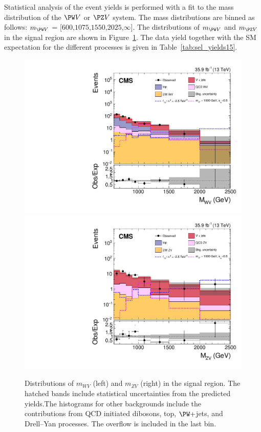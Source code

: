 Statistical analysis of the event yields is performed with a fit to the mass distribution of the $\PW V$ or $\PZ V$ system. The mass distributions are binned as follows: $m_{\PW V}$ = [$600$,$1075$,$1550$,$2025$,$\infty$]. The distributions of $m_{\PW V}$ and $m_{\PZ V}$ in the signal region are shown in Figure~\ref{fig:signal2}. The data yield together with the SM expectation for the different processes is given in Table~\ref{tab:sel_yields15}.


\begin{figure}[htb]
\centering
\includegraphics[width=\cmsFigWidth]{Plots/plots/wv_signal.pdf}
\includegraphics[width=\cmsFigWidth]{Plots/plots/zv_signal.pdf}
\caption{Distributions of $m_{WV}$ (left) and $m_{ZV}$ (right) in
the signal region. The hatched bands include statistical uncertainties from the predicted yields.The histograms for other backgrounds include the contributions
from QCD initiated dibosons, top, $\PW+$jets, and Drell--Yan processes. The overflow is included in the last bin.}
\label{fig:signal2}
\end{figure}


